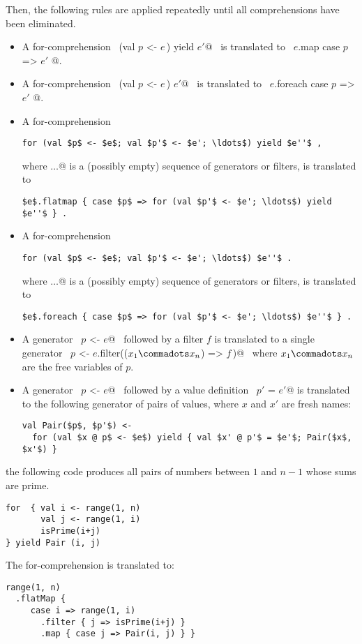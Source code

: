Then, the following rules are applied repeatedly until all
comprehensions have been eliminated.
\begin{itemize}
\item
A for-comprehension 
~\lstinline@for (val $p$ <- $e\,$) yield $e'$@~ 
is translated to
~\lstinline@$e$.map { case $p$ => $e'$ }@.

\item
A for-comprehension
~\lstinline@for (val $p$ <- $e\,$) $e'$@~ 
is translated to
~\lstinline@$e$.foreach { case $p$ => $e'$ }@.

\item
A for-comprehension
\begin{lstlisting}
for (val $p$ <- $e$; val $p'$ <- $e'; \ldots$) yield $e''$ ,
\end{lstlisting}
where \lstinline@$\ldots$@ is a (possibly empty)
sequence of generators or filters,
is translated to
\begin{lstlisting}
$e$.flatmap { case $p$ => for (val $p'$ <- $e'; \ldots$) yield $e''$ } .
\end{lstlisting}
\item
A for-comprehension
\begin{lstlisting}
for (val $p$ <- $e$; val $p'$ <- $e'; \ldots$) $e''$ .
\end{lstlisting}
where \lstinline@$\ldots$@ is a (possibly empty)
sequence of generators or filters,
is translated to
\begin{lstlisting}
$e$.foreach { case $p$ => for (val $p'$ <- $e'; \ldots$) $e''$ } .
\end{lstlisting}
\item
A generator ~\lstinline@val $p$ <- $e$@~ followed by a filter $f$ is translated to
a single generator ~\lstinline@val $p$ <- $e$.filter(($x_1 \commadots x_n$) => $f\,$)@~ where
$x_1 \commadots x_n$ are the free variables of $p$.
\item
A generator ~\lstinline@val $p$ <- $e$@~ followed by a value definition 
~\lstinline@val $p'$ = $e'$@ is translated to the following generator of pairs of values, where
$x$ and $x'$ are fresh names:
\begin{lstlisting}
val Pair($p$, $p'$) <- 
  for (val $x @ p$ <- $e$) yield { val $x' @ p'$ = $e'$; Pair($x$, $x'$) }
\end{lstlisting}
\end{itemize}

\example
the following code produces all pairs of numbers
between $1$ and $n-1$ whose sums are prime.
\begin{lstlisting}
for  { val i <- range(1, n) 
       val j <- range(1, i) 
       isPrime(i+j)
} yield Pair (i, j)
\end{lstlisting}
The for-comprehension is translated to:
\begin{lstlisting}
range(1, n)
  .flatMap {
     case i => range(1, i)
       .filter { j => isPrime(i+j) }
       .map { case j => Pair(i, j) } }
\end{lstlisting}

